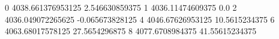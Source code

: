 0 4038.661376953125 2.546630859375
1 4036.11474609375 0.0
2 4036.049072265625 -0.065673828125
4 4046.67626953125 10.5615234375
6 4063.68017578125 27.5654296875
8 4077.6708984375 41.55615234375

